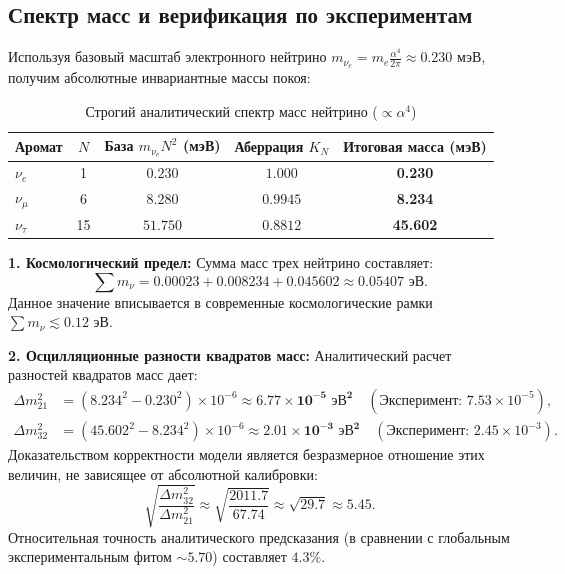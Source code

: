 \documentclass[11pt,a4paper]{article}
\begin{document}
	\subsection{Спектр масс и верификация по экспериментам}
	Используя базовый масштаб электронного нейтрино $m_{\nu_e} = m_e \frac{\alpha^4}{2\pi} \approx 0.230$ мэВ, получим абсолютные инвариантные массы покоя:
	
	\begin{table}[h]
		\centering
		\caption{Строгий аналитический спектр масс нейтрино ($\propto \alpha^4$)}
		\renewcommand{\arraystretch}{1.3}
		\begin{tabular}{lcccc}
			\toprule
			Аромат & $N$ & База $m_{\nu_e} N^2$ (мэВ) & Аберрация $K_N$ & Итоговая масса (мэВ) \\
			\midrule
			$\nu_e$   & 1  & $0.230$  & $1.000$ & \textbf{0.230} \\
			$\nu_\mu$ & 6  & $8.280$  & $0.9945$ & \textbf{8.234} \\
			$\nu_\tau$ & 15 & $51.750$ & $0.8812$ & \textbf{45.602} \\
			\bottomrule
		\end{tabular}
	\end{table}
	
	\textbf{1. Космологический предел:}
	Сумма масс трех нейтрино составляет:
	\begin{equation}
		\sum m_\nu = 0.00023 + 0.008234 + 0.045602 \approx \mathbf{0.05407 \text{ эВ}}.
	\end{equation}
	Данное значение вписывается в современные космологические рамки $\sum m_\nu \lesssim 0.12$ эВ.
	
	\textbf{2. Осцилляционные разности квадратов масс:}
	Аналитический расчет разностей квадратов масс дает:
	\begin{align}
		\Delta m^2_{21} &= (8.234^2 - 0.230^2) \times 10^{-6} \approx \mathbf{6.77 \times 10^{-5} \text{ эВ}^2} \quad (\text{Эксперимент: } 7.53 \times 10^{-5}), \\
		\Delta m^2_{32} &= (45.602^2 - 8.234^2) \times 10^{-6} \approx \mathbf{2.01 \times 10^{-3} \text{ эВ}^2} \quad (\text{Эксперимент: } 2.45 \times 10^{-3}).
	\end{align}
	Доказательством корректности модели является безразмерное отношение этих величин, не зависящее от абсолютной калибровки:
	\begin{equation}
		\sqrt{\frac{\Delta m^2_{32}}{\Delta m^2_{21}}} \approx \sqrt{\frac{2011.7}{67.74}} \approx \sqrt{29.7} \approx \mathbf{5.45}.
	\end{equation}
	Относительная точность аналитического предсказания (в сравнении с глобальным экспериментальным фитом $\sim 5.70$) составляет $4.3\%$.
	
\end{document}
